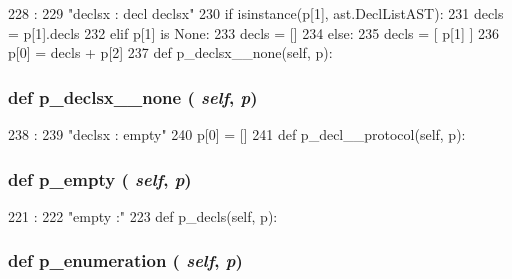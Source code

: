 \begin{DoxyCode}
228                                :
229         "declsx : decl declsx"
230         if isinstance(p[1], ast.DeclListAST):
231             decls = p[1].decls
232         elif p[1] is None:
233             decls = []
234         else:
235             decls = [ p[1] ]
236         p[0] = decls + p[2]
237 
    def p_declsx__none(self, p):
\end{DoxyCode}
\hypertarget{classslicc_1_1parser_1_1SLICC_a4e8c2cf044109c2b98d5cd719763dba0}{
\subsubsection[{p\_\-declsx\_\-\_\-none}]{\setlength{\rightskip}{0pt plus 5cm}def p\_\-declsx\_\-\_\-none ( {\em self}, \/   {\em p})}}
\label{classslicc_1_1parser_1_1SLICC_a4e8c2cf044109c2b98d5cd719763dba0}



\begin{DoxyCode}
238                                :
239         "declsx : empty"
240         p[0] = []
241 
    def p_decl__protocol(self, p):
\end{DoxyCode}
\hypertarget{classslicc_1_1parser_1_1SLICC_a7838c6749e452fa55c474e8b3f995a6c}{
\subsubsection[{p\_\-empty}]{\setlength{\rightskip}{0pt plus 5cm}def p\_\-empty ( {\em self}, \/   {\em p})}}
\label{classslicc_1_1parser_1_1SLICC_a7838c6749e452fa55c474e8b3f995a6c}



\begin{DoxyCode}
221                         :
222         "empty :"
223 
    def p_decls(self, p):
\end{DoxyCode}
\hypertarget{classslicc_1_1parser_1_1SLICC_a226b90fa8461df80629cd8b1c2864844}{
\subsubsection[{p\_\-enumeration}]{\setlength{\rightskip}{0pt plus 5cm}def p\_\-enumeration ( {\em self}, \/   {\em p})}}
\label{classslicc_1_1parser_1_1SLICC_a226b90fa8461df80629cd8b1c2864844}



